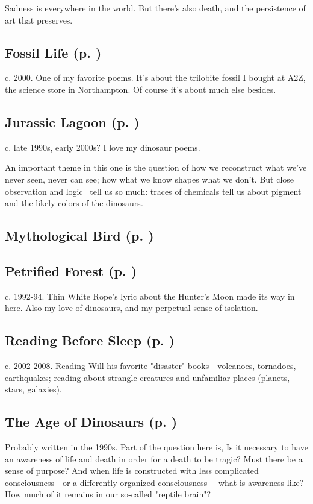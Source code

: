 Sadness is everywhere in the world. But
there's also death, and the persistence of art that preserves.

\subsection*{Fossil Life (p. \pageref{ch:fossil_life})}
c. 2000. One of my favorite poems. It's about the
trilobite fossil I bought at A2Z, the science store in Northampton. Of
course it's about much else besides.

\subsection*{Jurassic Lagoon (p. \pageref{ch:jurassic_lagoon})}
c. late 1990s, early 2000s? I love my dinosaur poems.

An important theme in this one is the question of how we reconstruct
what we've never seen, never can see; how what we know shapes what we
don't. But close observation and logic~ tell us so much: traces of
chemicals tell us about pigment and the likely colors of the dinosaurs.

\subsection*{Mythological Bird (p. \pageref{ch:mythological_bird})}
\subsection*{Petrified Forest (p. \pageref{ch:petrified_forest})}
c. 1992-94. Thin White Rope's lyric about the Hunter's
Moon made its way in here. Also my love of dinosaurs, and my perpetual
sense of isolation.

\subsection*{Reading Before Sleep (p. \pageref{ch:reading_before_sleep})}
c. 2002-2008. Reading Will his favorite "disaster"
books---volcanoes, tornadoes, earthquakes; reading about strangle
creatures and unfamiliar places (planets, stars,
galaxies).

\subsection*{The Age of Dinosaurs (p. \pageref{ch:the_age_of_dinosaurs})}
Probably written in the 1990s. Part of the question here is, Is it necessary to have an awareness of
life and death in order for a death to be tragic? Must there be a sense
of purpose? And when life is constructed with less complicated
consciousness---or a differently organized consciousness--- what is
awareness like? How much of it remains in our so-called "reptile
brain"?


